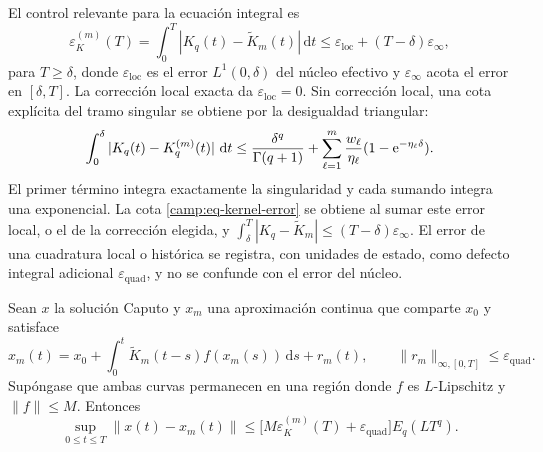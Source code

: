 El control relevante para la ecuación integral es
\begin{equation}
 \varepsilon_K^{(m)}(T)=
 \int_0^{T}\left|K_q(t)-\widetilde K_m(t)\right|\,\mathrm dt
 \leq\varepsilon_{\mathrm{loc}}+(T-\delta)\varepsilon_\infty,
 \label{camp:eq-kernel-error}
\end{equation}
para \(T\geq\delta\), donde \(\varepsilon_{\mathrm{loc}}\) es el error
\(L^1(0,\delta)\) del núcleo efectivo y \(\varepsilon_\infty\) acota el error
en \([\delta,T]\). La corrección local exacta da
\(\varepsilon_{\mathrm{loc}}=0\). Sin corrección local, una cota explícita del tramo singular se obtiene por
la desigualdad triangular:
\[
 \int_0^\delta|K_q(t)-K_q^{(m)}(t)|\,\,\mathrm d t
 \leq\frac{\delta^q}{\Gamma(q+1)}
       +\sum_{\ell=1}^m\frac{w_\ell}{\eta_\ell}
                         (1-\mathrm e^{-\eta_\ell\delta}).
\]
El primer término integra exactamente la singularidad y cada sumando integra
una exponencial. La cota \cref{camp:eq-kernel-error} se obtiene al sumar este
error local, o el de la corrección elegida, y
\(\int_\delta^T|K_q-\widetilde K_m|\leq(T-\delta)\varepsilon_\infty\).
El error de una cuadratura local o histórica
se registra, con unidades de estado, como defecto integral adicional
\(\varepsilon_{\mathrm{quad}}\), y no se confunde con el error del núcleo.

\begin{proposition}
\label{camp:prop-soe-error-finite}
Sean \(x\) la solución Caputo y \(x_m\) una aproximación continua que comparte
\(x_0\) y satisface
\[
 x_m(t)=x_0+\int_0^t\widetilde K_m(t-s)f(x_m(s))\,\mathrm ds+r_m(t),
 \qquad \|r_m\|_{\infty,[0,T]}\leq\varepsilon_{\mathrm{quad}}.
\]
Supóngase que ambas curvas permanecen en una región donde \(f\) es
\(L\)-Lipschitz y \(\|f\|\leq M\). Entonces
\begin{equation}
 \sup_{0\leq t\leq T}\|x(t)-x_m(t)\|
 \leq\bigl[M\varepsilon_K^{(m)}(T)+\varepsilon_{\mathrm{quad}}\bigr]
       E_q(LT^q).
 \label{camp:eq-soe-solution-error}
\end{equation}
\end{proposition}

